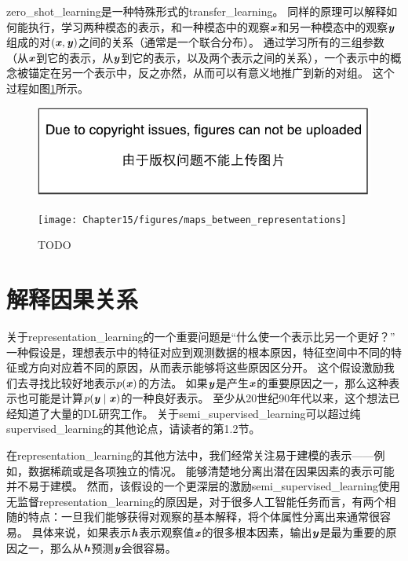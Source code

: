 \gls{zero_shot_learning}是一种特殊形式的\gls{transfer_learning}。
同样的原理可以解释如何能执行，学习两种模态的表示，和一种模态中的观察$\boldsymbol{\mathit{x}}$和另一种模态中的观察$\boldsymbol{\mathit{y}}$组成的对$(\boldsymbol{\mathit{x}}, \boldsymbol{\mathit{y}})$之间的关系（通常是一个联合分布）\citep{Srivastava+Salakhutdinov-NIPS2012-small}。
通过学习所有的三组参数（从$\boldsymbol{\mathit{x}}$到它的表示，从$\boldsymbol{\mathit{y}}$到它的表示，以及两个表示之间的关系），一个表示中的概念被锚定在另一个表示中，反之亦然，从而可以有意义地推广到新的对组。
这个过程如图\ref{fig:chap15_maps_between_representations}所示。

\begin{figure}[!htb]
\ifOpenSource
\centerline{\includegraphics{figure.pdf}}
\else
\centerline{\texttt{[image: Chapter15/figures/maps\_between\_representations]}}
\fi
\caption{TODO}
\label{fig:chap15_maps_between_representations}
\end{figure}


\section{解释因果关系}
\label{sec:semi_supervised_disentangling_of_causal_factors}
关于\gls{representation_learning}的一个重要问题是``什么使一个表示比另一个更好？''
一种假设是，理想表示中的特征对应到观测数据的根本原因，特征空间中不同的特征或方向对应着不同的原因，从而表示能够将这些原因区分开。
这个假设激励我们去寻找比较好地表示$p(\boldsymbol{\mathit{x}})$的方法。
如果$\boldsymbol{\mathit{y}}$是产生$\boldsymbol{\mathit{x}}$的重要原因之一，那么这种表示也可能是计算$p(\boldsymbol{\mathit{y}} \mid \boldsymbol{\mathit{x}})$的一种良好表示。
至少从20世纪90年代以来，这个想法已经知道了大量的\gls{DL}研究工作\citep{Becker92,hinton1999unsupervised}。
关于\gls{semi_supervised_learning}可以超过纯\gls{supervised_learning}的其他论点，请读者\cite{Chapelle-2006}的第1.2节。


在\gls{representation_learning}的其他方法中，我们经常关注易于建模的表示——例如，数据稀疏或是各项独立的情况。
能够清楚地分离出潜在因果因素的表示可能并不易于建模。
然而，该假设的一个更深层的激励\gls{semi_supervised_learning}使用无监督\gls{representation_learning}的原因是，对于很多人工智能任务而言，有两个相随的特点：一旦我们能够获得对观察的基本解释，将个体属性分离出来通常很容易。
具体来说，如果表示$\boldsymbol{\mathit{h}}$表示观察值$\boldsymbol{\mathit{x}}$的很多根本因素，输出$\boldsymbol{\mathit{y}}$是最为重要的原因之一，那么从$\boldsymbol{\mathit{h}}$预测$\boldsymbol{\mathit{y}}$会很容易。


